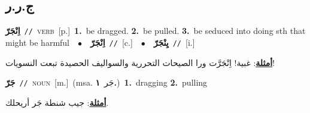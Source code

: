 \documentclass[10pt,a4paper,twoside]{article} %
\begin{document}
\begin{multicols}{2}
\vspace{-3mm}
\subsection*{\color{blue}\foreignlanguage{arabic}{ج.ر.ر}\color{blue}{}} 

{\setlength\topsep{0pt}\textbf{\foreignlanguage{arabic}{اِنْجَرّ}}\ {\color{gray}\texttt{//}\color{black}}\ \textsc{verb}\ [p.]\ \textbf{1.}~be dragged.  \textbf{2.}~be pulled.  \textbf{3.}~be seduced into doing sth that might be harmful\ \ $\bullet$\ \ \setlength\topsep{0pt}\textbf{\foreignlanguage{arabic}{اِنْجَرّ}}\ {\color{gray}\texttt{//}\color{black}}\ [c.]\ \ $\bullet$\ \ \setlength\topsep{0pt}\textbf{\foreignlanguage{arabic}{يِنْجَرّ}}\ {\color{gray}\texttt{//}\color{black}}\ [i.]\  \begin{flushright}\color{gray}\foreignlanguage{arabic}{\textbf{\underline{\foreignlanguage{arabic}{أمثلة}}}: غبية! اِنْجَرَّت ورا الصيحات التحررية والسواليف الحصيدة تبعت النسويات!}\end{flushright}\color{black}} \vspace{2mm}

{\setlength\topsep{0pt}\textbf{\foreignlanguage{arabic}{جَرّ}}\ {\color{gray}\texttt{//}\color{black}}\ \textsc{noun}\ [m.]\ \color{gray}(msa. \foreignlanguage{arabic}{جَر}~\foreignlanguage{arabic}{\textbf{١.}})\color{black}\ \textbf{1.}~dragging  \textbf{2.}~pulling\  \begin{flushright}\color{gray}\foreignlanguage{arabic}{\textbf{\underline{\foreignlanguage{arabic}{أمثلة}}}: جيب شنطة جَر أريحلك.}\end{flushright}\color{black}} \vspace{2mm}


\end{multicols}
\end{document}

